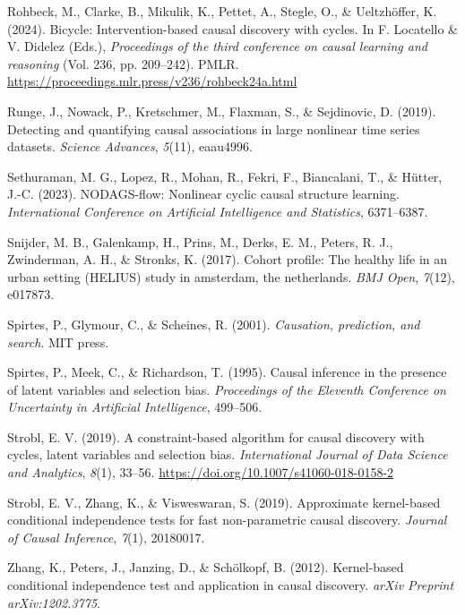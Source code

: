 \documentclass[
]{article}
\newlength{\cslhangindent}
\newenvironment{CSLReferences}[2] %
 {\begin{list}{}{%
  \setlength{\itemindent}{0pt}
  \setlength{\leftmargin}{0pt}
  \setlength{\parsep}{0pt}
  \ifodd #1
   \setlength{\leftmargin}{\cslhangindent}
   \setlength{\itemindent}{-1\cslhangindent}
  \fi
  \setlength{\itemsep}{#2\baselineskip}}}
 {\end{list}}
\begin{document}
\begin{CSLReferences}{1}{0}
Rohbeck, M., Clarke, B., Mikulik, K., Pettet, A., Stegle, O., \&
Ueltzhöffer, K. (2024). Bicycle: Intervention-based causal discovery
with cycles. In F. Locatello \& V. Didelez (Eds.), \emph{Proceedings of
the third conference on causal learning and reasoning} (Vol. 236, pp.
209--242). PMLR.
\url{https://proceedings.mlr.press/v236/rohbeck24a.html}

Runge, J., Nowack, P., Kretschmer, M., Flaxman, S., \& Sejdinovic, D.
(2019). Detecting and quantifying causal associations in large nonlinear
time series datasets. \emph{Science Advances}, \emph{5}(11), eaau4996.

Sethuraman, M. G., Lopez, R., Mohan, R., Fekri, F., Biancalani, T., \&
Hütter, J.-C. (2023). NODAGS-flow: Nonlinear cyclic causal structure
learning. \emph{International Conference on Artificial Intelligence and
Statistics}, 6371--6387.

Snijder, M. B., Galenkamp, H., Prins, M., Derks, E. M., Peters, R. J.,
Zwinderman, A. H., \& Stronks, K. (2017). Cohort profile: The healthy
life in an urban setting (HELIUS) study in amsterdam, the netherlands.
\emph{BMJ Open}, \emph{7}(12), e017873.

Spirtes, P., Glymour, C., \& Scheines, R. (2001). \emph{Causation,
prediction, and search}. MIT press.

Spirtes, P., Meek, C., \& Richardson, T. (1995). Causal inference in the
presence of latent variables and selection bias. \emph{Proceedings of
the {Eleventh} Conference on {Uncertainty} in Artificial Intelligence},
499--506.

Strobl, E. V. (2019). A constraint-based algorithm for causal discovery
with cycles, latent variables and selection bias. \emph{International
Journal of Data Science and Analytics}, \emph{8}(1), 33--56.
\url{https://doi.org/10.1007/s41060-018-0158-2}

Strobl, E. V., Zhang, K., \& Visweswaran, S. (2019). Approximate
kernel-based conditional independence tests for fast non-parametric
causal discovery. \emph{Journal of Causal Inference}, \emph{7}(1),
20180017.

Zhang, K., Peters, J., Janzing, D., \& Schölkopf, B. (2012).
Kernel-based conditional independence test and application in causal
discovery. \emph{arXiv Preprint arXiv:1202.3775}.

\end{CSLReferences}
\end{document}
